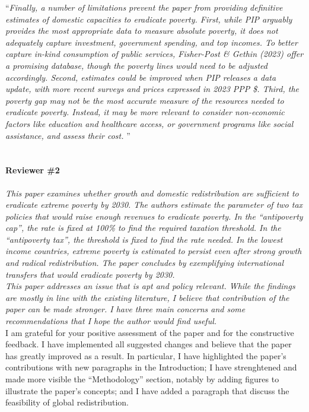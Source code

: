 \documentclass[12pt,english]{article}
\begin{document}
``\textit{Finally, a number of limitations prevent the paper from providing definitive estimates of domestic capacities to eradicate poverty. First, while PIP arguably provides the most appropriate data to measure absolute poverty, it does not adequately capture investment, government spending, and top incomes. To better capture in-kind consumption of public services, Fisher-Post \& Gethin (2023) offer a promising database, though the poverty lines would need to be adjusted accordingly. Second, estimates could be improved when PIP releases a data update, with more recent surveys and prices expressed in 2023 PPP \$. Third, the poverty gap may not be the most accurate measure of the resources needed to eradicate poverty. Instead, it may be more relevant to consider non-economic factors like education and healthcare access, or government programs like social assistance, and assess their cost. }''
~\\ ~\\


\paragraph*{Reviewer \#2}

\textit{This paper examines whether growth and domestic redistribution are sufficient to eradicate extreme poverty by 2030. The authors estimate the parameter of two tax policies that would raise enough revenues to eradicate poverty. In the “antipoverty cap”, the rate is fixed at 100\% to find the required taxation threshold. In the “antipoverty tax”, the threshold is fixed to find the rate needed. In the lowest income countries, extreme poverty is estimated to persist even after strong growth and radical redistribution. The paper concludes by exemplifying international transfers that would eradicate poverty by 2030. }~\\

\textit{This paper addresses an issue that is apt and policy relevant. While the findings are mostly in line with the existing literature, I believe that contribution of the paper can be made stronger. I have three main concerns and some recommendations that I hope the author would find useful. }~\\

I am grateful for your positive assessment of the paper and for the constructive feedback. I have implemented all suggested changes and believe that the paper has greatly improved as a result. In particular, I have highlighted the paper's contributions with new paragraphs in the Introduction; I have strenghtened and made more visible the ``Methodology'' section, notably by adding figures to illustrate the paper's concepts; and I have added a paragraph that discuss the feasibility of global redistribution.
~\\ ~\\
 
\end{document}
